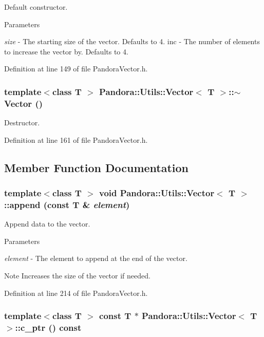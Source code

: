 Default constructor. 
\begin{DoxyParams}{Parameters}
\item[{\em size}]-\/ The starting size of the vector. Defaults to 4. inc -\/ The number of elements to increase the vector by. Defaults to 4. \end{DoxyParams}


Definition at line 149 of file PandoraVector.h.\hypertarget{classPandora_1_1Utils_1_1Vector_ab2688a6e46b857ad4756d21adadb0a20}{
\subsubsection[{$\sim$Vector}]{\setlength{\rightskip}{0pt plus 5cm}template$<$class T $>$ {\bf Pandora::Utils::Vector}$<$ T $>$::$\sim${\bf Vector} ()}}
\label{classPandora_1_1Utils_1_1Vector_ab2688a6e46b857ad4756d21adadb0a20}


Destructor. 

Definition at line 161 of file PandoraVector.h.

\subsection{Member Function Documentation}
\hypertarget{classPandora_1_1Utils_1_1Vector_a6c1c963c1d58b1e371a07c048c33cdca}{
\subsubsection[{append}]{\setlength{\rightskip}{0pt plus 5cm}template$<$class T $>$ void {\bf Pandora::Utils::Vector}$<$ T $>$::append (const T \& {\em element})}}
\label{classPandora_1_1Utils_1_1Vector_a6c1c963c1d58b1e371a07c048c33cdca}


Append data to the vector. 
\begin{DoxyParams}{Parameters}
\item[{\em element}]-\/ The element to append at the end of the vector. \end{DoxyParams}
\begin{DoxyNote}{Note}
Increases the size of the vector if needed. 
\end{DoxyNote}


Definition at line 214 of file PandoraVector.h.\hypertarget{classPandora_1_1Utils_1_1Vector_a8ee2539ddb6b94eff47b6453143b2b83}{
\subsubsection[{c\_\-ptr}]{\setlength{\rightskip}{0pt plus 5cm}template$<$class T $>$ const T $\ast$ {\bf Pandora::Utils::Vector}$<$ T $>$::c\_\-ptr () const}}
\label{classPandora_1_1Utils_1_1Vector_a8ee2539ddb6b94eff47b6453143b2b83}


